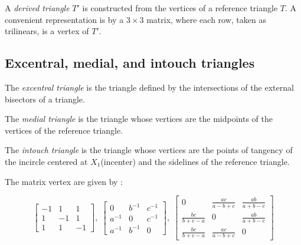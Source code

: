 A {\em derived triangle} $T'$ is constructed from the vertices of  a reference triangle $T$. A convenient representation is by a $3\times  3$  matrix, where each row, taken as trilinears, is a vertex of $T'$.




\subsection{Excentral, medial, and intouch triangles}

The {\em  excentral triangle} is the triangle defined by the intersections of the external bisectors of a triangle.

\noindent The {\em medial triangle} is the triangle whose vertices are the midpoints of the vertices of the reference triangle.

\noindent The {\em intouch triangle}  is the triangle whose vertices are the points of tangency of the  incircle centered at $X_1$(incenter) and the sidelines of the reference triangle.



The matrix vertex are given by \cite{mw}: 



\begin{equation*}
\left[
\begin{matrix}
-1&1&1\\1&-1&1\\1&1&-1
\end{matrix}
\right],\;
\left[
\begin{matrix}
0&b^{-1}&c^{-1}\\a^{-1}&0&c^{-1}\\a^{-1}&b^{-1}&0
\end{matrix}
\right],\;
\left[
\begin{matrix}
0&\frac{a c}{a-b+c}&\frac{a b}{a+b-c}\\
\frac{b c}{ b+c-a}&0&\frac{a b}{a+b-c}\\
\frac{b c}{ b+c-a}&\frac{a c}{a-b+c}&0
\end{matrix}
\right]
\end{equation*}

